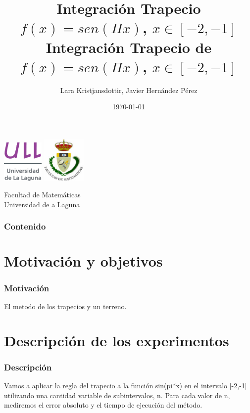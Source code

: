 \documentclass{beamer}
\title{Integración Trapecio \\ $f(x)=sen(\Pi x)$, $x \in [-2,-1]$}
\author{Lara Kristjansdottir, Javier Hernández Pérez}
\date{\today}
\begin{document}
\begin{frame}
  \includegraphics[width=0.15\textwidth]{img/ullesc.eps}
  \hspace*{7.5cm}
  \includegraphics[width=0.16\textwidth]{img/fmatesc.eps}
  \titlepage
  \begin{scriptsize}
    \begin{center}
    \title{Integración Trapecio de $f(x)=sen(\Pi x)$, $x \in [-2,-1]$}
      Facultad de Matemáticas \\Universidad de a Laguna
    \end{center}
  \end{scriptsize}
\end{frame}
\begin{frame}
  \frametitle{Contenido}
  \tableofcontents
\end{frame} 
\section{Motivación y objetivos}
\begin{frame}
\frametitle{Motivación}

El metodo de los trapecios y un terreno.
\end{frame}
\section{Descripción de los experimentos}
\begin{frame}
  \frametitle{Descripción}
  Vamos a aplicar la regla del trapecio a la función sin(pi*x) en el intervalo [-2,-1] utilizando una cantidad variable de subintervalos, n. Para cada valor de n, mediremos el error absoluto y el tiempo de ejecución del método.
\end{frame}
\end{document}
